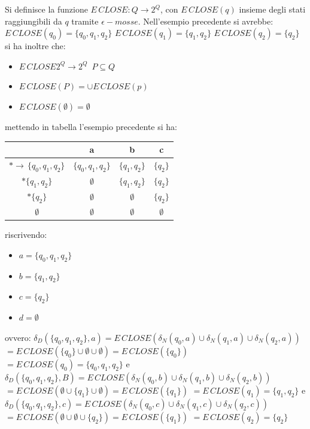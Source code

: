 Si definisce la funzione $E\,CLOSE:Q\to 2^Q$, con $E\,CLOSE(q)$ insieme degli stati raggiungibili da $q$ tramite $\epsilon-mosse$. Nell'esempio precedente si avrebbe:
$E\,CLOSE(q_0)=\{q_0,q_1,q_2\}$
$E\,CLOSE(q_1)=\{q_1,q_2\}$
$E\,CLOSE(q_2)=\{q_2\}$
si ha inoltre che:
\begin{itemize}
	\item $E\,CLOSE 2^Q\to 2^Q\,\,\, P\subseteq Q$
	\item $E\,CLOSE(P)=\cup E\,CLOSE(p)$
	\item $E\,CLOSE(\emptyset)=\emptyset$
\end{itemize}
mettendo in tabella l'esempio precedente si ha:
\begin{center}
	\begin{tabular}{c|c|c|c}
		                        & a                 & b             & c           \\
		\hline
		$*\to\,\{q_0,q_1,q_2\}$ & $\{q_0,q_1,q_2\}$ & $\{q_1,q_2\}$ & $\{q_2\}$   \\
		\hline
		$*\{q_1,q_2\}$          & $\emptyset$       & $\{q_1,q_2\}$ & $\{q_2\}$   \\
		\hline
		$*\{q_2\}$              & $\emptyset$       & $\emptyset$   & $\{q_2\}$   \\
		\hline
		$\emptyset$             & $\emptyset$       & $\emptyset$   & $\emptyset$
	\end{tabular}
\end{center}
riscrivendo:
\begin{itemize}
	\item $a=\{q_0,q_1,q_2\}$
	\item $b=\{q_1,q_2\}$
	\item $c=\{q_2\}$
	\item $d=\emptyset$
\end{itemize}
ovvero:
$\delta_D(\{q_0,q_1,q_2\},a)=E\,CLOSE(\delta_N(q_0,a)\cup \delta_N(q_1,a)\cup \delta_N(q_2,a))$
$=E\,CLOSE(\{q_0\} \cup \emptyset\cup \emptyset)=E\,CLOSE(\{q_0\})$
$=E\,CLOSE  (q_0)=\{q_0,q_1,q_2\}$
e
$\delta_D(\{q_0,q_1,q_2\},B)=E\,CLOSE(\delta_N(q_0,b)\cup \delta_N(q_1,b)\cup \delta_N(q_2,b))$
$=E\,CLOSE(\emptyset \cup \{q_1\}\cup \emptyset)=E\,CLOSE(\{q_1\})$
$=E\,CLOSE  (q_1)=\{q_1,q_2\}$
e
$\delta_D(\{q_0,q_1,q_2\},c)=E\,CLOSE(\delta_N(q_0,c)\cup \delta_N(q_1,c)\cup \delta_N(q_2,c))$
$=E\,CLOSE(\emptyset \cup \emptyset\cup \{q_2\})=E\,CLOSE(\{q_1\})$
$=E\,CLOSE  (q_2)=\{q_2\}$

